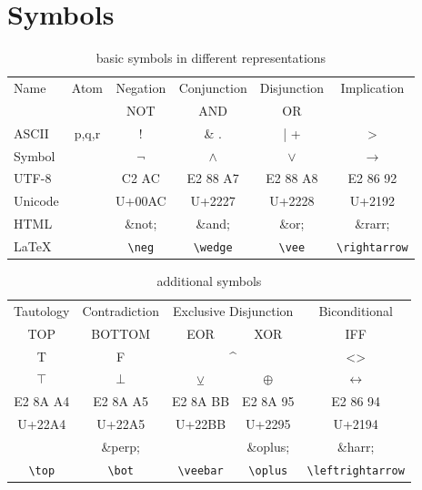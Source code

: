 




\chapter{Symbols}

\begin{table}[htdp]
\begin{center}
\begin{tabular}{lccccc}
Name	& Atom 	& Negation		& Conjunction		& Disjunction		&  Implication \\
		&  		& NOT		& AND		& OR		&   \\
ASCII 	& p,q,r 	& ! 			& \& \quad .	& |  \quad +			&> 	\\
Symbol  	&		& $\neg$		& $\wedge$	& {$\vee$}		&$\rightarrow$ \\ 
UTF-8	&		& C2 AC		& E2 88 A7	& {E2 88 A8}	&E2 86 92\\
Unicode	&		& U+00AC 	& U+2227		& {U+2228}	&U+2192\\
HTML	&		& \&not;		& \&and;		& \&or;		& \&rarr;  \\
LaTeX	&		& \verb+\neg+	& \verb+\wedge+ & \verb+\vee+ & \verb+\rightarrow+ \\

\end{tabular}
\caption{basic symbols in different representations}
\end{center}
\label{tab:BASICSYMBOLS}
\end{table}%

\begin{table}[htdp]
\begin{center}
\begin{tabular}{ccccc}
Tautology		& Contradiction		& \multicolumn{2}{c}{Exclusive Disjunction}	& Biconditional \\	
TOP			& BOTTOM		& EOR & XOR							& IFF \\
T \quad 1		& F  \quad 0		& \multicolumn{2}{c}{\textasciicircum} 		& <> \\
$\top$		& $\bot$			& $\veebar$ 							&$\oplus$   			&$ \leftrightarrow$\\
E2 8A A4		& E2 8A A5		& E2 8A BB							& E2 8A 95			&E2 86 94\\
U+22A4		& U+22A5			& U+22BB							& U+2295				&U+2194\\
			& \&perp;			&									& \&oplus;				& \&harr;\\
\verb+\top+	& \verb+\bot+	& \verb+\veebar+ & \verb+\oplus+	& \verb+\leftrightarrow+
\end{tabular}
\caption{additional symbols}
\end{center}
\label{tab:ADDITIONALSYMBOLS}
\end{table}%



